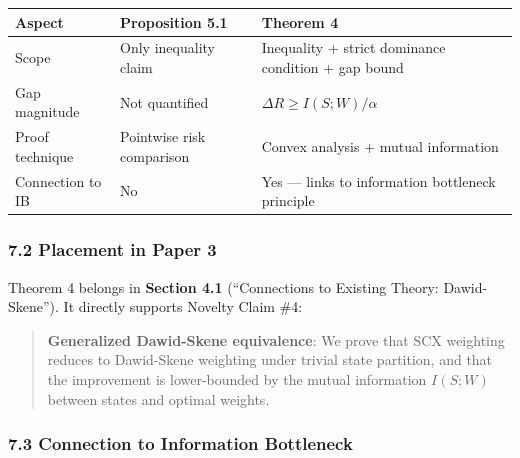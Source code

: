 \documentclass[
  12pt,
]{ctexart}
\begin{document}
\begin{longtable}[]{@{}
  >{\raggedright\arraybackslash}p{}
  >{\raggedright\arraybackslash}p{}
  >{\raggedright\arraybackslash}p{}@{}}
\toprule\noalign{}
\begin{minipage}[b]{\linewidth}\raggedright
Aspect
\end{minipage} & \begin{minipage}[b]{\linewidth}\raggedright
Proposition 5.1
\end{minipage} & \begin{minipage}[b]{\linewidth}\raggedright
Theorem 4
\end{minipage} \\
\midrule\noalign{}
\endhead
\bottomrule\noalign{}
\endlastfoot
Scope & Only inequality claim & Inequality + strict dominance condition
+ gap bound \\
Gap magnitude & Not quantified & \(\Delta R \geq I(S; W)/\alpha\) \\
Proof technique & Pointwise risk comparison & Convex analysis + mutual
information \\
Connection to IB & No & Yes --- links to information bottleneck
principle \\
\end{longtable}

\subsubsection{7.2 Placement in Paper 3}\label{placement-in-paper-3}

Theorem 4 belongs in \textbf{Section 4.1} (``Connections to Existing
Theory: Dawid-Skene''). It directly supports Novelty Claim \#4:

\begin{quote}
\textbf{Generalized Dawid-Skene equivalence}: We prove that SCX
weighting reduces to Dawid-Skene weighting under trivial state
partition, and that the improvement is lower-bounded by the mutual
information \(I(S; W)\) between states and optimal weights.
\end{quote}

\subsubsection{7.3 Connection to Information
Bottleneck}\label{connection-to-information-bottleneck}
\end{document}
